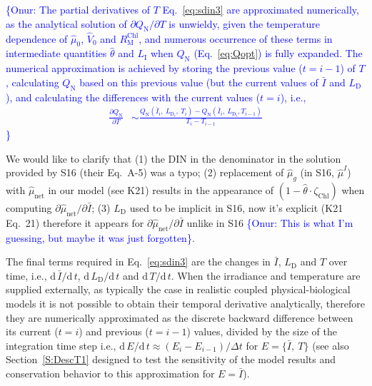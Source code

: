 \documentclass[gmd, manuscript, draft]{copernicus}
\newcommand{\onur}[1]{\textcolor{blue}{\{Onur: #1\}}}
\begin{document}
\onur{
The partial derivatives of $T$ Eq.~\eqref{eq:sdin3} are approximated numerically, as the analytical solution of $\partial Q_{\text{N}}/\partial T$ is unwieldy, given the temperature dependence of $\hat{\mu}_0$,  $\hat{V}_0$ and $R_{\text{M}}^{\text{Chl}}$, and numerous occurrence of these terms in intermediate quantities $\hat{\theta}$ and $L_{\text{I}}$ when $Q_{\text{N}}$ (Eq.~\ref{eq:Qopt}) is fully expanded. The numerical approximation is achieved by storing the previous value ($t=i-1$) of $T$, calculating $Q_{\text{N}}$ based on this previous value (but the current values of $\bar{I}$ and $L_{\text{D}}$), and calculating the differences with the current values ($t=i$), i.e.,
\begin{align}
 \frac{\partial Q_{\text{N}}}{\partial T} & \sim
 \frac{Q_{\text{N}}(\bar{I}_{i},\ L_{\text{D}_i},\ T_{i}) - Q_{\text{N}}(\bar{I}_{i},\ L_{\text{D}_i},T_{i-1})} {T_{i} - T_{i-1}} 
\end{align}
}

We would like to clarify that (1) the DIN in the denominator in the solution provided by S16 (their Eq.~A-5) was a typo; (2) replacement of $\hat{\mu}_g$ (in S16, $\hat{\mu}^I$) with $\hat{\mu}_{\text{net}}$ in our model (see K21) results in the appearance of $(1-\hat{\theta} \cdot \zeta_{\text{Chl}})$ when computing $\partial \hat{\mu}_{\text{net}} / \partial \bar{I}$; (3) $L_{\text{D}}$ used to be implicit in S16, now it's explicit (K21 Eq.~21) therefore it appears for $\partial\hat{\mu}_{\text{net}} / \partial \bar{I}$ unlike in S16 \onur{This is what I'm guessing, but maybe it was just forgotten}. %

The final terms required in Eq.~\eqref{eq:sdin3} are the changes in $\bar{I}$, $L_{\text{D}}$ and $T$ over time, i.e., $\text{d}\,\bar{I} / \text{d}\,t$, $\text{d}\,L_{\text{D}} / \text{d}\,t$ 
and $\text{d}\,T / \text{d}\,t$. 
When the irradiance and temperature are supplied externally, as typically the case in realistic coupled physical-biological models it is not possible to obtain their temporal derivative analytically, therefore they are numerically approximated as the discrete backward difference between its current ($t=i$) and previous ($t=i-1$) values, divided by the size of the integration time step i.e., $\text{d}\, E / \text{d}\, t \approx (E_{i} - E_{i-1}) / \Delta t$ for $E=\{\bar{I},\ T\}$ (see also Section~\ref{S:DescT1} designed to test the sensitivity of the model results and conservation behavior to this approximation for $E=\bar{I}$).
\end{document}
